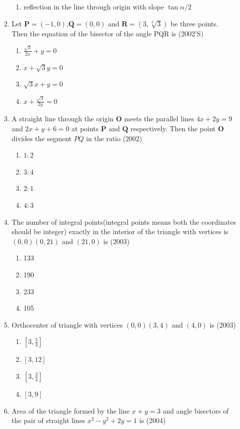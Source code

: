 \documentclass[12pt]{article}
\providecommand{\sbrak}[1]{\ensuremath{{}\left[#1\right]}}
\let\vec\mathbf
\begin{document}
\begin{enumerate}
\begin{enumerate}
\begin{enumerate}
\item reflection in the line through origin with slope $\tan\alpha/2$
\end{enumerate}
\item Let $\vec{P}=(-1,0)$,$\vec{Q}=(0,0)$ and $\vec{R}=(3,\sqrt[3]{3})$ be three points.\\
Then the equation of the bisector of the angle PQR is (2002'S)
\begin{enumerate}
\item $\frac{\sqrt{3}}{2x}+y=0$ 
\item $x+\sqrt{3}y=0$
\item $\sqrt{3}x+y=0$ 
\item $x+\frac{\sqrt{3}}{2y}=0$
\end{enumerate}
\item A straight line through the origin $\vec{O}$ meets the parallel lines $4x+2y=9$ and $2x+y+6=0$ at points $\vec{P}$ and $\vec{Q}$ respectively. Then the point $\vec{O}$ divides the segment $PQ$ in the ratio (2002)
\begin{enumerate}
\item $1:2$   
\item $3:4$
\item $2:1$ 
\item $4:3$ 
\end{enumerate}
\item The number of integral points(integral points means both the coordinates should be integer) exactly in the interior of the triangle with vertices is $(0,0)(0,21)$ and $(21,0)$ is (2003)
\begin{enumerate}
\item 133  
\item 190  
\item 233 
\item 105
\end{enumerate}
\item Orthocenter of triangle with vertices $(0,0)(3,4)$ and $(4,0)$ is  (2003)
\begin{enumerate}
\item $\sbrak{3,\frac{5}{4}}$ 
\item $\sbrak{3,12}$   
\item $\sbrak{3,\frac{3}{4}}$ 
\item $\sbrak{3,9}$
\end{enumerate}
\item Area of the triangle formed by the line $x+y=3$ and angle bisectors of the pair of straight lines $x^2-y^2+2y=1$ is (2004)
\begin{enumerate}

\end{enumerate}
\end{enumerate}
\end{enumerate}
\end{document}
